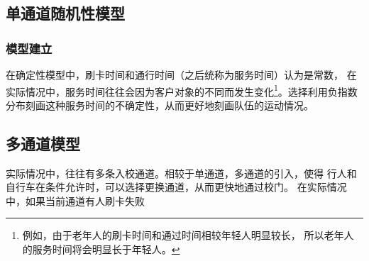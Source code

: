 \subsection{单通道随机性模型}
\subsubsection{模型建立}
在确定性模型中，刷卡时间和通行时间（之后统称为服务时间）认为是常数，
在实际情况中，服务时间往往会因为客户对象的不同而发生变化\footnote{
    例如，由于老年人的刷卡时间和通过时间相较年轻人明显较长，
    所以老年人的服务时间将会明显长于年轻人。
}。选择利用负指数分布刻画这种服务时间的不确定性，从而更好地刻画队伍的运动情况。


\subsection{多通道模型}
\par 实际情况中，往往有多条入校通道。相较于单通道，多通道的引入，使得
行人和自行车在条件允许时，可以选择更换通道，从而更快地通过校门。
在实际情况中，如果当前通道有人刷卡失败
